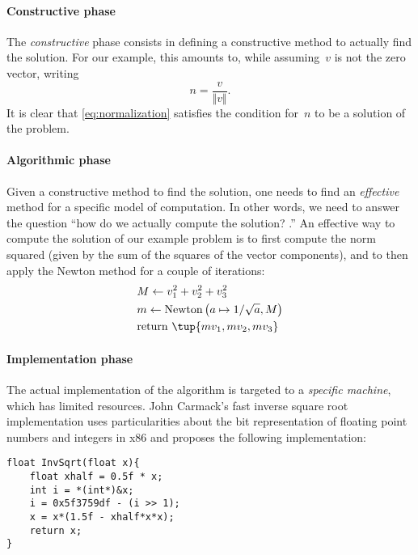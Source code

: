 \paragraph*{Constructive phase}
The \emph{constructive} phase consists in defining a constructive method to actually find the solution.
For our example, this amounts to, while assuming~$v$ is not the zero vector, writing
\begin{equation}
	\label{eq:normalization}
	n=\frac{v}{\Vert v \Vert}.
\end{equation}
It is clear that \cref{eq:normalization} satisfies the condition for~$n$ to be a solution of the problem.
\paragraph*{Algorithmic phase}
Given a constructive method to find the solution, one needs to find an \emph{effective} method for a specific model of computation.
In other words, we need to answer the question ``how do we actually compute the solution?
.''
An effective way to compute the solution of our example problem is to first compute the norm squared (given by the sum of the squares of the vector components), and to then apply the Newton method for a couple of iterations:
\begin{equation}
	\label{eq:newton_normalization}
	\begin{aligned}
		 & M\leftarrow v_1^2+v_2^2+v_3^2                               \\
		 & m\leftarrow \text{Newton}\left(a\mapsto 1/\sqrt{a},M\right) \\
		 & \text{return }\tup{mv_1,mv_2,mv_3}
	\end{aligned}
\end{equation}
%

\paragraph*{Implementation phase}
The actual implementation of the algorithm is targeted to a \emph{specific machine}, which has limited resources.
John Carmack's fast inverse square root implementation uses particularities about the bit representation of floating point numbers and integers in x86 and proposes the following implementation:

\begin{center}
	\begin{verbatim}
float InvSqrt(float x){
    float xhalf = 0.5f * x;
    int i = *(int*)&x;
    i = 0x5f3759df - (i >> 1);
    x = x*(1.5f - xhalf*x*x);
    return x;
}
    \end{verbatim}
\end{center}

